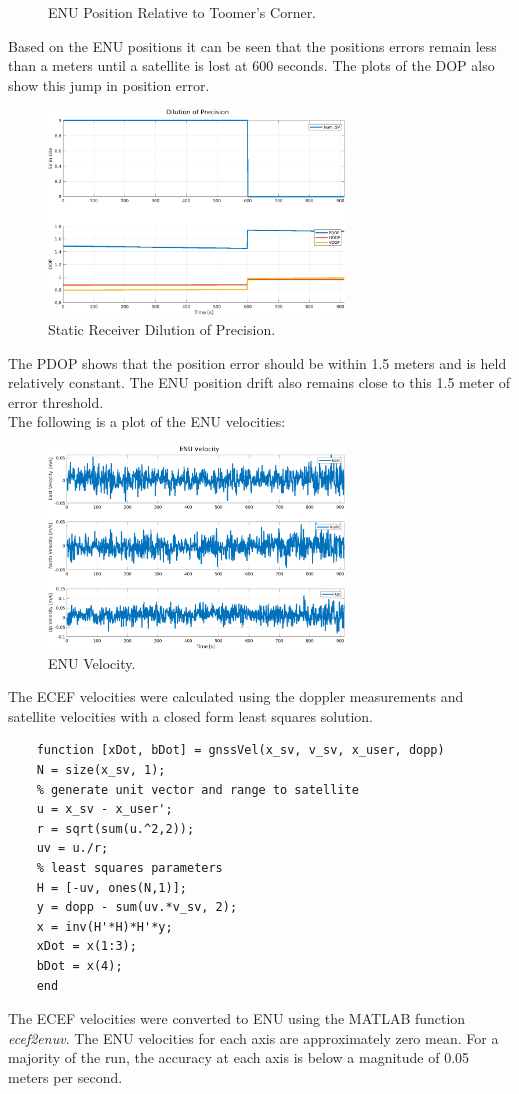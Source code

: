 \documentclass[11pt]{article}
\begin{document}
\begin{enumerate}[label=\textbf{\arabic*.}]
\begin{figure}[H]
    \caption{ENU Position Relative to Toomer's Corner.}
  \end{figure}
  Based on the ENU positions it can be seen that the positions errors remain 
  less than a meters until a satellite is lost at 600 seconds. The plots of 
  the DOP also show this jump in position error.
  \begin{figure}[H]
    \centering
    \includegraphics[width=0.7\textwidth]{static_dop.png}
    \caption{Static Receiver Dilution of Precision.}
  \end{figure}
  The PDOP shows that the position error should be within 1.5 meters and is 
  held relatively constant. The ENU position drift also remains close to this 1.5 
  meter of error threshold. \\

  The following is a plot of the ENU velocities:
  \begin{figure}[H]
    \centering
    \includegraphics[width=0.7\textwidth]{static_vel_enu.png}
    \caption{ENU Velocity.}
  \end{figure}
  The ECEF velocities were calculated using the doppler measurements and 
  satellite velocities with a closed form least squares solution. 
  \begin{lstlisting}
    function [xDot, bDot] = gnssVel(x_sv, v_sv, x_user, dopp)
    N = size(x_sv, 1);
    % generate unit vector and range to satellite
    u = x_sv - x_user';
    r = sqrt(sum(u.^2,2));
    uv = u./r;
    % least squares parameters
    H = [-uv, ones(N,1)];
    y = dopp - sum(uv.*v_sv, 2);
    x = inv(H'*H)*H'*y;
    xDot = x(1:3);
    bDot = x(4);
    end    
  \end{lstlisting}
  The ECEF velocities were converted to ENU using the MATLAB function 
  \emph{ecef2enuv}. The ENU velocities for each axis are approximately 
  zero mean. For a majority of the run, the accuracy at each axis is below 
   a magnitude of 0.05 meters per second. 


\end{enumerate}
\end{document}
